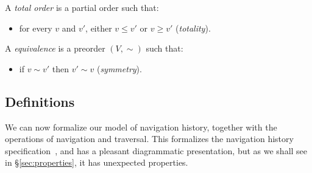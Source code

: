 \documentclass{notes}
\newcommand{\Verts}{V}
\newcommand{\aVert}{v}
\begin{document}
A \emph{total order} is a partial order such that:
\begin{itemize}
\item for every $\aVert$ and $\aVert'$, either $\aVert\le\aVert'$ or $\aVert\ge\aVert'$ (\emph{totality}).
\end{itemize}
A \emph{equivalence} is a preorder $(\Verts,{\sim})$ such that:
\begin{itemize}
\item if $\aVert\sim\aVert'$ then $\aVert'\sim\aVert$ (\emph{symmetry}).
\end{itemize}

\subsection{Definitions}
\label{sec:defns}

We can now formalize our model of navigation history, together with
the operations of navigation and traversal. This formalizes the
navigation history specification~\cite{whatwg}, and has a pleasant
diagrammatic presentation, but as we shall see in
\S\ref{sec:properties}, it has unexpected properties.
\end{document}
